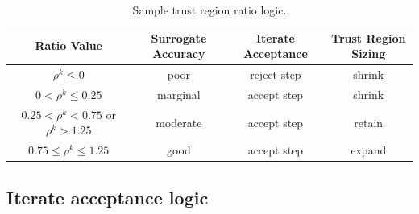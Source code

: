 \begin{table}
\centering
\caption{Sample trust region ratio logic.}
\label{tab:rho_k}
\begin{tabular}{cccc}
\hline
Ratio Value & Surrogate Accuracy & Iterate Acceptance & Trust Region Sizing \\
\hline
$\rho^k \le 0$ 
& poor
& reject step 
& shrink \\
$0 < \rho^k \le 0.25$
& marginal
& accept step
& shrink \\
$0.25 < \rho^k < 0.75$ or $\rho^k > 1.25$
& moderate
& accept step
& retain \\
$0.75 \le \rho^k \le 1.25$
& good
& accept step
& expand\footnotemark \\
\hline
\end{tabular}
\end{table}



\subsection{Iterate acceptance logic} \label{sbm:sblm_con_iter}

